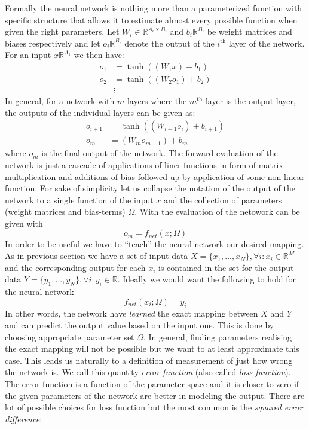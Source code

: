 \documentclass[12pt,a4paper,twoside]{scrartcl}
\numberwithin{equation}{section}
\begin{document}
Formally the neural network is nothing more than a parameterized function with specific structure that allows it to estimate almost every possible function when given the right parameters. Let \(W_i \in \mathbb{R}^{A_i \times B_i }\) and \(b_i\mathbb{R}^{B_i}\) be weight matrices and biases respectively and let \(o_i\mathbb{R}^{B_i}\) denote the output of the \(i^\text{th}\) layer of the network. For an input \(x \mathbb{R}^{A_1}\) we then have:
\begin{align}
  o_{1} &= \tanh((W_{1}x) + b_{1}) \\
  o_{2} &= \tanh((W_{2}o_1) + b_{2}) \\
        &\vdots
\end{align}
In general, for a network with \(m\) layers where the \(m^{\text{th}}\) layer is the output layer, the outputs of the individual layers can be given as:
\begin{align}
  \label{eq:nn-ouput}
  o_{i+1}  &= \tanh((W_{i+1}o_i) + b_{i+1}) \\
  o_m     &= (W_{m}o_{m-1}) + b_{m}
\end{align}
where \(o_m \) is the final output of the network. The forward evaluation of the network is just a cascade of applications of liner functions in form of matrix multiplication and additions of bias followed up by application of some non-linear function. For sake of simplicity let us collapse the notation of the output  of the network to a single function of the input \(x\) and the collection of parameters (weight matrices and bias-terms) \(\Omega\). With the evaluation of the netowork can be given with
\begin{equation}
    o_m = f_{net}(x; \Omega)
\end{equation}
In order to be useful we have to ``teach'' the neural network our desired mapping. As in previous section we have a set of input data \(X = \{x_1,..., x_N\}, \forall i : x_i\in\mathbb{R}^M\) and the corresponding output for each \(x_i\) is contained in the set for the output data \(Y = \{y_1,...,y_N\}, \forall i : y_i\in\mathbb{R}\). Ideally we would want the following to hold for the neural network
\begin{equation}
  f_{net}(x_i;\Omega) = y_i
\end{equation}
In other words, the network have \emph{learned} the exact mapping between \(X\) and \(Y\) and can predict the output value based on the input one. This is done by choosing appropriate parameter set \(\Omega\). In general, finding parameters realising the exact mapping will not be possible but we want to at least approximate this case. This leads us naturally to a definition of measurement of just how wrong the network is. We call this quantity \emph{error function} (also called \emph{loss function}). The error function is a function of the parameter space and it is closer to zero if the given parameters of the network are better in modeling the output. There are lot of possible choices for loss function but the most common is the \emph{squared error difference}:
\end{document}

